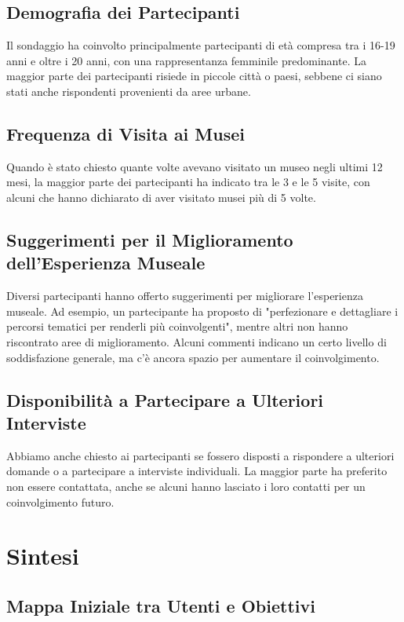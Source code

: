 \documentclass{article}
\begin{document}
\subsection{Demografia dei Partecipanti}

Il sondaggio ha coinvolto principalmente partecipanti di età compresa tra i 16-19 anni e oltre i 20 anni, con una rappresentanza femminile predominante. La maggior parte dei partecipanti risiede in piccole città o paesi, sebbene ci siano stati anche rispondenti provenienti da aree urbane.

\subsection{Frequenza di Visita ai Musei}

Quando è stato chiesto quante volte avevano visitato un museo negli ultimi 12 mesi, la maggior parte dei partecipanti ha indicato tra le 3 e le 5 visite, con alcuni che hanno dichiarato di aver visitato musei più di 5 volte.

\subsection{Suggerimenti per il Miglioramento dell'Esperienza Museale}

Diversi partecipanti hanno offerto suggerimenti per migliorare l'esperienza museale. Ad esempio, un partecipante ha proposto di "perfezionare e dettagliare i percorsi tematici per renderli più coinvolgenti", mentre altri non hanno riscontrato aree di miglioramento. Alcuni commenti indicano un certo livello di soddisfazione generale, ma c'è ancora spazio per aumentare il coinvolgimento.

\subsection{Disponibilità a Partecipare a Ulteriori Interviste}

Abbiamo anche chiesto ai partecipanti se fossero disposti a rispondere a ulteriori domande o a partecipare a interviste individuali. La maggior parte ha preferito non essere contattata, anche se alcuni hanno lasciato i loro contatti per un coinvolgimento futuro.

\section{Sintesi}

\subsection{Mappa Iniziale tra Utenti e Obiettivi}
\end{document}
